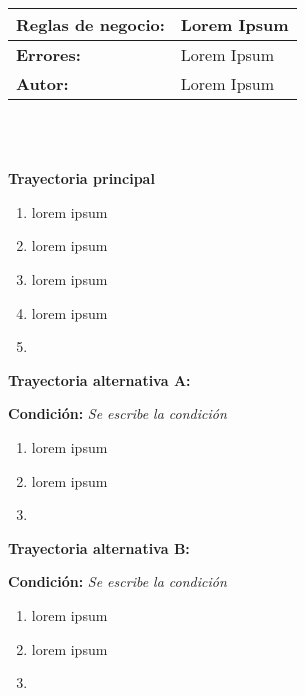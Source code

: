 \begin{tabular}{|l|l|}
	\textbf{Reglas de negocio:} & Lorem Ipsum \\
	\hline

	\textbf{Errores:} & Lorem Ipsum \\
	\hline

	\textbf{Autor:} & Lorem Ipsum \\
	\hline

\end{tabular}\\\\



\begin{large}
	\textbf{Trayectoria principal}\\
\end{large}	

\begin{enumerate}[1.]
	\item \actor lorem ipsum
	\item \sistema lorem ipsum
	\item \sistema lorem ipsum
	\item \sistema lorem ipsum
	\item \finCU	
\end{enumerate}



\begin{large}
	\textbf{Trayectoria alternativa A:}\\
\end{large}	
\textbf{Condición:} \textit{Se escribe la condición}
\begin{enumerate}[{A-}1.]

	\item \actor lorem ipsum
	\item \sistema lorem ipsum
	\item \finTA	

\end{enumerate}


\begin{large}
	\textbf{Trayectoria alternativa B:}\\
\end{large}	
\textbf{Condición:} \textit{Se escribe la condición}

\begin{enumerate}[{B-}1.]

	\item \actor lorem ipsum
	\item \sistema lorem ipsum
	\item \finTA	

\end{enumerate}


